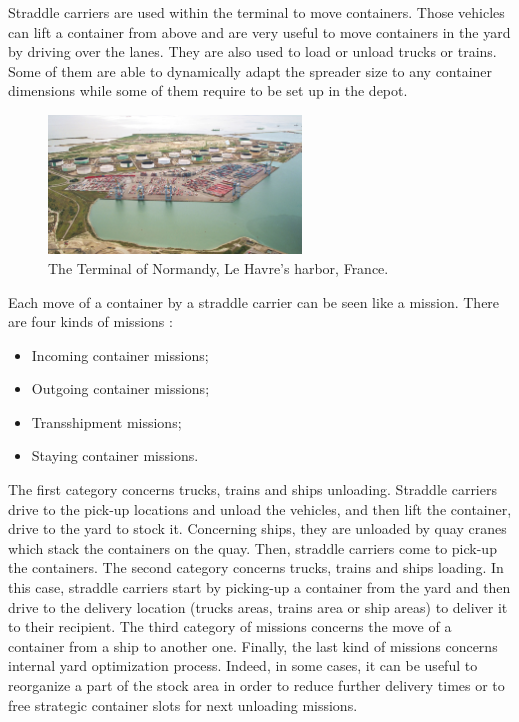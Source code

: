 \documentclass[a4paper,10pt]{article}
\begin{document}
Straddle carriers are used within the terminal to move containers. Those vehicles can lift a container from above and are very useful to move containers in the yard by driving over the lanes. They are also used to load or unload trucks or trains. Some of them are able to dynamically adapt the spreader size to any container dimensions while some of them require to be set up in the depot.%


\begin{figure}[h]
  \begin{center}
  \includegraphics[width=0.6\textwidth]{Figures/terminalOfNormandy}
  \caption{The Terminal of Normandy, Le Havre's harbor, France.}
\end{center}
\end{figure}

Each move of a container by a straddle carrier can be seen like a mission. There are four kinds of missions :
\begin{itemize}
	\item Incoming container missions;
	\item Outgoing container missions;
	\item Transshipment missions;
	\item Staying container missions.
\end{itemize}

The first category concerns trucks, trains and ships unloading. Straddle carriers drive to the pick-up locations and unload the vehicles, and then lift the container, drive to the yard to stock it. Concerning ships, they are unloaded by quay cranes which stack the containers on the quay. Then, straddle carriers come to pick-up the containers.
The second category concerns trucks, trains and ships loading. In this case, straddle carriers start by picking-up a container from the yard and then drive to the delivery location (trucks areas, trains area or ship areas) to deliver it to their recipient. 
The third category of missions concerns the move of a container from a ship to another one.
Finally, the last kind of missions concerns internal yard optimization process. Indeed, in some cases, it can be useful to reorganize a part of the stock area in order to reduce further delivery times or to free strategic container slots for next unloading missions.
\end{document}
